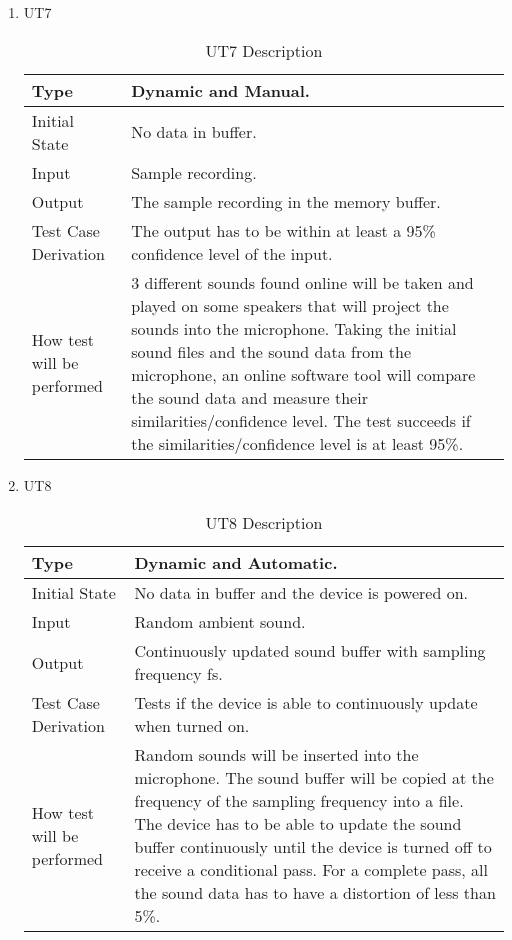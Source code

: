 \documentclass[12pt, titlepage]{article}
\begin{document}
\begin{enumerate}

\item{UT7}
\begin{table}[H]
    \caption{UT7 Description}
\begin{tabular}{ |p{5cm}||p{7cm}| }
    \hline
    Type & Dynamic and Manual. \\
    \hline
    Initial State  &  No data in buffer. \\
    \hline
    Input &   Sample recording. \\
    \hline
    Output &   The sample recording in the memory buffer.  \\
    \hline
    Test Case Derivation &   The output has to be within at least a 95\% confidence level of the input. \\
    \hline
    How test will be performed & 3 different sounds found online will be taken and played on some speakers that will project the sounds into the microphone. Taking the initial sound files and the sound data from the microphone, an online software tool will compare the sound data and measure their similarities/confidence level. The test succeeds if the similarities/confidence level is at least 95\%. \\
    \hline
\end{tabular}
\end{table}
\item{UT8}
\begin{table}[H]
    \caption{UT8 Description}
\begin{tabular}{ |p{5cm}||p{7cm}| }
    \hline
    Type & Dynamic and Automatic. \\
    \hline
    Initial State  &  No data in buffer and the device is powered on. \\
    \hline
    Input &   Random ambient sound. \\
    \hline
    Output &   Continuously updated sound buffer with sampling frequency fs.  \\
    \hline
    Test Case Derivation &   Tests if the device is able to continuously update when turned on. \\
    \hline
    How test will be performed & Random sounds will be inserted into the microphone. The sound buffer will be copied at the frequency of the sampling frequency into a file. The device has to be able to update the sound buffer continuously until the device is turned off to receive a conditional pass. For a complete pass, all the sound data has to have a distortion of less than 5\%. \\
    \hline
\end{tabular}
\end{table}
\end{enumerate}
\end{document}
